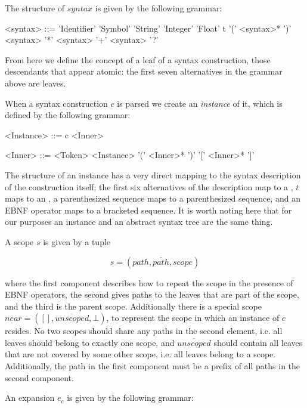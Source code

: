 \documentclass{kththesis}
\begin{document}
The structure of $syntax$ is given by the following grammar:

\setlength{\grammarindent}{6em}
\begin{grammar}
<syntax> ::= 'Identifier'
  \alt 'Symbol'
  \alt 'String'
  \alt 'Integer'
  \alt 'Float'
  \alt t
  \alt '(' <syntax>* ')'
  \alt <syntax> '*'
  \alt <syntax> '+'
  \alt <syntax> '?'
\end{grammar}

From here we define the concept of a leaf of a syntax construction, those descendants that appear atomic: the first seven alternatives in the grammar above are leaves.

When a syntax construction $c$ is parsed we create an \emph{instance} of it, which is defined by the following grammar:

\setlength{\grammarindent}{6.5em}
\begin{grammar}
<Instance> ::= c <Inner>

<Inner> ::= <Token>
  \alt <Instance>
  \alt '(' <Inner>* ')'
  \alt '[' <Inner>* ']'
\end{grammar}

The structure of an instance has a very direct mapping to the syntax description of the construction itself; the first six alternatives of the description map to a , $t$ maps to an , a parenthesized sequence maps to a parenthesized sequence, and an EBNF operator maps to a bracketed sequence. It is worth noting here that for our purposes an instance and an abstract syntax tree are the same thing.

A scope $s$ is given by a tuple

$$ s = (path, \overline{path}, scope) $$

where the first component describes how to repeat the scope in the presence of EBNF operators, the second gives paths to the leaves that are part of the scope, and the third is the parent scope. Additionally there is a special scope $near = ([], \overline{unscoped}, \bot)$, to represent the scope in which an instance of $c$ resides. No two scopes should share any paths in the second element, i.e. all leaves should belong to exactly one scope, and $\overline{unscoped}$ should contain all leaves that are not covered by some other scope, i.e. all leaves belong to a scope. Additionally, the path in the first component must be a prefix of all paths in the second component.

An expansion $e_c$ is given by the following grammar:
\end{document}
